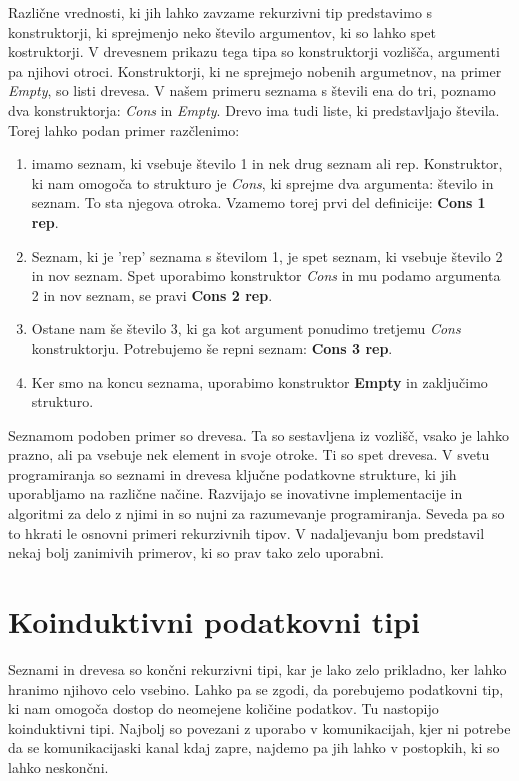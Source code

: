 \documentclass[12pt,a4paper,openany]{book}
\begin{document}
Različne vrednosti, ki jih lahko zavzame rekurzivni tip predstavimo s konstruktorji, ki sprejmenjo neko število argumentov, ki so lahko spet kostruktorji. V drevesnem prikazu tega tipa so 
konstruktorji vozlišča, argumenti pa njihovi otroci. Konstruktorji, ki ne sprejmejo nobenih argumetnov, na primer \emph{Empty}, so listi drevesa. V našem primeru seznama s števili 
ena do tri, poznamo dva konstruktorja: \emph{Cons} in \emph{Empty}. Drevo ima tudi liste, ki predstavljajo števila. Torej lahko podan primer razčlenimo:
\begin{enumerate}
    \item imamo seznam, ki vsebuje število 1 in nek drug seznam ali rep. Konstruktor, ki nam omogoča to strukturo je \emph{Cons}, ki sprejme dva argumenta: število in seznam. To sta 
    njegova otroka. Vzamemo torej prvi del definicije: \textbf{Cons 1 rep}.
    \item Seznam, ki je 'rep' seznama s številom 1, je spet seznam, ki vsebuje število 2 in nov seznam. Spet uporabimo konstruktor \emph{Cons} in mu podamo argumenta 2 in nov seznam, se pravi 
    \textbf{Cons 2 rep}.
    \item Ostane nam še število 3, ki ga kot argument ponudimo tretjemu \emph{Cons} konstruktorju. Potrebujemo še repni seznam: \textbf{Cons 3 rep}.
    \item Ker smo na koncu seznama, uporabimo konstruktor \textbf{Empty} in zaključimo strukturo.
\end{enumerate}

Seznamom podoben primer so drevesa. Ta so sestavljena iz vozlišč, vsako je lahko prazno, ali pa vsebuje nek element in svoje otroke. Ti so spet drevesa. V svetu programiranja so seznami in 
drevesa ključne podatkovne strukture, ki jih uporabljamo na različne načine. Razvijajo se inovativne implementacije in algoritmi za delo z njimi in so nujni za razumevanje programiranja.
Seveda pa so to hkrati le osnovni primeri rekurzivnih tipov. V nadaljevanju bom predstavil nekaj bolj zanimivih primerov, ki so prav tako zelo uporabni.

\section{Koinduktivni podatkovni tipi}
Seznami in drevesa so končni rekurzivni tipi, kar je lako zelo prikladno, ker lahko hranimo njihovo celo vsebino. Lahko pa se zgodi, da porebujemo podatkovni tip, ki nam omogoča dostop do 
neomejene količine podatkov. Tu nastopijo koinduktivni tipi. Najbolj so povezani z uporabo v komunikacijah, kjer ni potrebe da se komunikacijaski kanal kdaj zapre, najdemo pa jih lahko v  
postopkih, ki so lahko neskončni. 
\end{document}
